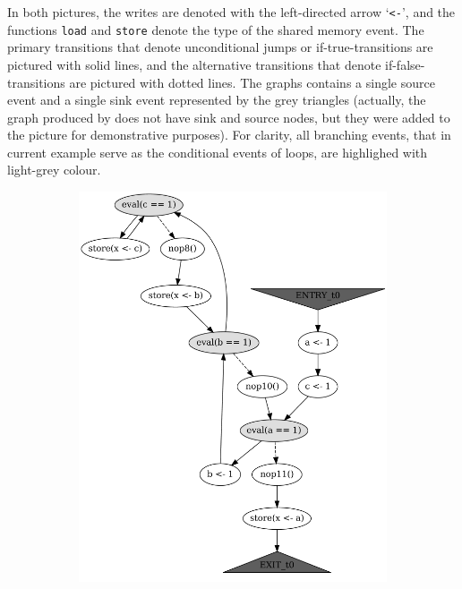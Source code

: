 In both pictures, the writes are denoted with the left-directed arrow `\lstinline{<-}', and the functions \lstinline{load} and \lstinline{store} denote the type of the shared memory event.
The primary transitions that denote unconditional jumps or if-true-transitions are pictured with solid lines, and the alternative transitions that denote if-false-transitions are pictured with dotted lines.
The graphs contains a single source event and a single sink event represented by the grey triangles (actually, the graph produced by \porthos[1] does not have sink and source nodes, but they were added to the picture for demonstrative purposes).
For clarity, all branching events, that in current example serve as the conditional events of loops, are highlighed with light-grey colour.

\begin{figure}[!h]
%
\begin{subfigure}[t]{.49\textwidth}\centering
  \includegraphics[width=\textwidth,keepaspectratio]{img/my/graphs/unrolling-comparison/PorthosC/t0.png}
  \hfill

\end{subfigure}
\end{figure}
